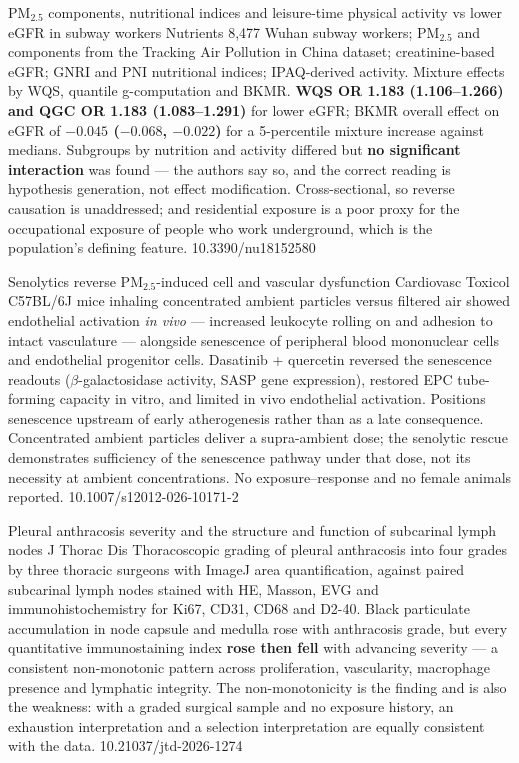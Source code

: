 \documentclass[10pt]{article}
\begin{document}

{PM$_{2.5}$ components, nutritional indices and leisure-time physical activity vs lower eGFR in subway workers}
{Nutrients}
{8{,}477 Wuhan subway workers; PM$_{2.5}$ and components from the Tracking Air Pollution
in China dataset; creatinine-based eGFR; GNRI and PNI nutritional indices; IPAQ-derived
activity. Mixture effects by WQS, quantile g-computation and BKMR.
\textbf{WQS OR 1.183 (1.106--1.266) and QGC OR 1.183 (1.083--1.291)} for lower eGFR;
BKMR overall effect on eGFR of \textbf{$-0.045$ ($-0.068$, $-0.022$)} for a 5-percentile
mixture increase against medians. Subgroups by nutrition and activity differed but
\textbf{no significant interaction} was found --- the authors say so, and the correct
reading is hypothesis generation, not effect modification. Cross-sectional, so reverse
causation is unaddressed; and residential exposure is a poor proxy for the occupational
exposure of people who work underground, which is the population's defining feature.}
{10.3390/nu18152580}


{Senolytics reverse PM$_{2.5}$-induced cell and vascular dysfunction}
{Cardiovasc Toxicol}
{C57BL/6J mice inhaling concentrated ambient particles versus filtered air showed
endothelial activation \emph{in vivo} --- increased leukocyte rolling on and adhesion to
intact vasculature --- alongside senescence of peripheral blood mononuclear cells and
endothelial progenitor cells. Dasatinib + quercetin reversed the senescence readouts
($\beta$-galactosidase activity, SASP gene expression), restored EPC tube-forming capacity
in vitro, and limited in vivo endothelial activation. Positions senescence upstream of
early atherogenesis rather than as a late consequence. Concentrated ambient particles
deliver a supra-ambient dose; the senolytic rescue demonstrates sufficiency of the
senescence pathway under that dose, not its necessity at ambient concentrations. No
exposure--response and no female animals reported.}
{10.1007/s12012-026-10171-2}

{Pleural anthracosis severity and the structure and function of subcarinal lymph nodes}
{J Thorac Dis}
{Thoracoscopic grading of pleural anthracosis into four grades by three thoracic surgeons
with ImageJ area quantification, against paired subcarinal lymph nodes stained with HE,
Masson, EVG and immunohistochemistry for Ki67, CD31, CD68 and D2-40. Black particulate
accumulation in node capsule and medulla rose with anthracosis grade, but every
quantitative immunostaining index \textbf{rose then fell} with advancing severity --- a
consistent non-monotonic pattern across proliferation, vascularity, macrophage presence
and lymphatic integrity. The non-monotonicity is the finding and is also the weakness:
with a graded surgical sample and no exposure history, an exhaustion interpretation and a
selection interpretation are equally consistent with the data.}
{10.21037/jtd-2026-1274}
\end{document}
